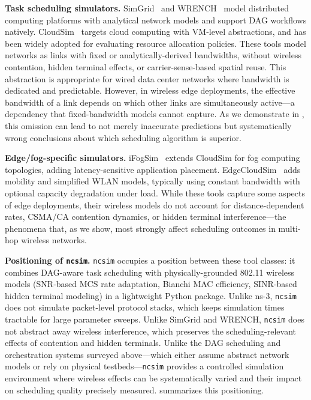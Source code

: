 \documentclass[conference]{IEEEtran}
\newcommand{\ncsim}{\texttt{ncsim}}
\begin{document}
\textbf{Task scheduling simulators.}
SimGrid~\cite{simgrid} and WRENCH~\cite{wrench} model distributed
computing platforms with analytical network models and support DAG
workflows natively.  CloudSim~\cite{cloudsim} targets cloud computing with
VM-level abstractions, and has been widely adopted for evaluating resource
allocation policies.  These tools model networks as links with
fixed or analytically-derived bandwidths, without wireless contention,
hidden terminal effects, or carrier-sense-based spatial reuse.  This
abstraction is appropriate for wired data center networks where bandwidth
is dedicated and predictable.  However, in wireless edge deployments, the
effective bandwidth of a link depends on which other links are
simultaneously active---a dependency that fixed-bandwidth models cannot
capture.  As we demonstrate in , this omission can lead to
not merely inaccurate predictions but systematically wrong conclusions about
which scheduling algorithm is superior.

\textbf{Edge/fog-specific simulators.}
iFogSim~\cite{ifogsim} extends CloudSim for fog computing topologies,
adding latency-sensitive application placement.
EdgeCloudSim~\cite{edgecloudsim} adds mobility and simplified WLAN
models, typically using constant bandwidth with optional capacity
degradation under load.  While these tools capture some aspects of
edge deployments, their wireless models do not account for
distance-dependent rates, CSMA/CA contention dynamics, or hidden
terminal interference---the phenomena that, as we show, most strongly
affect scheduling outcomes in multi-hop wireless networks.

\textbf{Positioning of \ncsim{}.}
\ncsim{} occupies a position between these tool classes: it combines
DAG-aware task scheduling with physically-grounded 802.11 wireless models
(SNR-based MCS rate adaptation, Bianchi MAC efficiency, SINR-based hidden
terminal modeling) in a lightweight Python package.  Unlike ns-3, \ncsim{}
does not simulate packet-level protocol stacks, which keeps simulation
times tractable for large parameter sweeps.  Unlike SimGrid and WRENCH,
\ncsim{} does not abstract away wireless interference, which preserves the
scheduling-relevant effects of contention and hidden terminals.
Unlike the DAG scheduling and orchestration systems surveyed above---which
either assume abstract network models or rely on physical testbeds---\ncsim{}
provides a controlled simulation environment where wireless effects can be
systematically varied and their impact on scheduling quality precisely
measured.   summarizes
this positioning.
\end{document}
